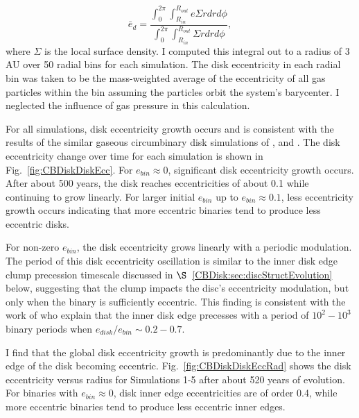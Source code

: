 \begin{equation}
\bar{e}_d = \frac{\int_0^{2 \pi} \int^{R_{out}}_{R_{in}} e \Sigma r dr d\phi }{\int_0^{2 \pi} \int^{R_{out}}_{R_{in}} \Sigma r dr d\phi},
\end{equation}
where $\Sigma$ is the local surface density. I computed this integral out to a radius of 3 AU over 50 radial bins for each simulation.  The disk eccentricity in each radial bin was taken to be the mass-weighted average of the eccentricity of all gas particles within the bin assuming the particles orbit the system's barycenter.  I neglected the influence of gas pressure in this calculation.

For all simulations, disk eccentricity growth occurs and is consistent with the results
of the similar gaseous circumbinary disk simulations of \citet{Kley2008}, \citet{Pierens2007,Pierens2013} and \citet{Farris2014}.  The disk eccentricity 
change over time for each simulation is shown in Fig.~\ref{fig:CBDiskDiskEcc}. For $e_{bin} \approx 0$, significant disk eccentricity growth occurs.  
After about 500 years, the disk reaches eccentricities of about 0.1 while continuing to grow linearly.  For larger initial $e_{bin}$ up 
to $e_{bin} \approx 0.1$, less eccentricity growth occurs indicating that more eccentric binaries tend to produce less eccentric disks.

For non-zero $e_{bin}$, the disk eccentricity grows linearly with a
periodic modulation.  The period of this disk eccentricity oscillation
is similar to the inner disk edge clump precession timescale discussed
in $\S$~\ref{CBDisk:sec:discStructEvolution} below, suggesting that the clump impacts the disc's eccentricity modulation, but only when the binary is sufficiently eccentric.  This finding is consistent with the work of \citet{Artymowicz2000} who explain that the inner disk edge precesses with a period of $10^2 - 10^3$ binary periods when $e_{disk}/e_{bin} \sim 0.2-0.7$.  

I find that the global disk eccentricity growth is predominantly due to the inner edge of the disk becoming eccentric.  Fig.~\ref{fig:CBDiskDiskEccRad} shows the disk eccentricity versus radius for Simulations 1-5 after about 520 years of evolution.  For binaries with $e_{bin} \approx 0$, disk inner edge eccentricities are of order 0.4, while more eccentric binaries tend to produce less eccentric inner edges.

